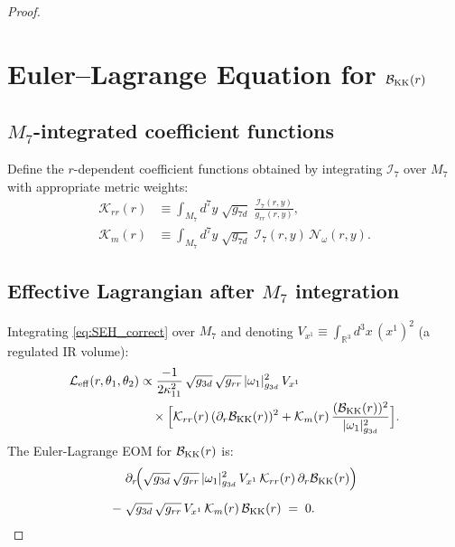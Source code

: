 \documentclass[a4paper,11pt,fleqn]{article}
\theoremstyle{plain}
\theoremstyle{definition}
\newcommand{\Nf}{{\cal B}_{\rm KK}(r)}
\newcommand{\gthree}{g_{3d}}
\newcommand{\gseven}{g_{7d}}
\newcommand{\grr}{g_{rr}}
\newcommand{\kap}{\kappa_{11}}
\newcommand{\Leff}{\mathcal{L}_{\mathrm{eff}}}
\newcommand{\Ical}{\mathcal{I}_7}
\begin{document}
\begin{proof}
\section*{Euler--Lagrange Equation for ${\cal B}_{\rm KK}(r)$}

\subsection*{$M_7$-integrated coefficient functions}

Define the $r$-dependent coefficient functions obtained by integrating $\Ical$
over $M_7$ with appropriate metric weights:
\begin{align}
  \mathcal{K}_{rr}(r)
  &\equiv
    \int_{M_7}d^7y\;\sqrt{\gseven}\;
    \frac{\Ical(r,y)}{\grr(r,y)},
  \label{eq:Krr}\\[4pt]
  \mathcal{K}_m(r)
  &\equiv
    \int_{M_7}d^7y\;\sqrt{\gseven}\;\Ical(r,y)\,\mathcal{N}_\omega(r,y).
  \label{eq:Km}
\end{align}

\subsection*{Effective Lagrangian after $M_7$ integration}

Integrating \eqref{eq:SEH_correct} over $M_7$ and denoting
$V_{x^1}\equiv\int_{\mathbb{R}^3}d^3x\,(x^1)^2$ (a regulated IR volume):
\begin{align}
  \Leff(r,\theta_1,\theta_2)
  &\propto \frac{-1}{2\kap^2}\,
     \sqrt{\gthree}\,\sqrt{\grr}\,
     |\omega_1|^2_{g_{3d}}\,V_{x^1}
  \nonumber\\
  &\quad\times
  \Bigl[
    \mathcal{K}_{rr}(r)\,(\partial_r\Nf)^2
        + \mathcal{K}_m(r)\,\frac{(\Nf)^2}{|\omega_1|^2_{g_{3d}}}
  \Bigr].
  \label{eq:Leff-proof}
\end{align}
The Euler-Lagrange EOM for ${\cal B}_{\rm KK}(r)$ is:
\begin{align}
  &\partial_r\!\Bigl(
    \sqrt{\gthree}\,\sqrt{\grr}\,
    |\omega_1|^2_{g_{3d}}\,V_{x^1}\,
    \mathcal{K}_{rr}(r)\,\partial_r\Nf
  \Bigr)
  \nonumber\\[5pt]
   -\;&\sqrt{\gthree}\,\sqrt{\grr}\,V_{x^1}\,
    \mathcal{K}_m(r)\,\Nf
  \;=\; 0.
  \label{eq:EOM-proof}
\end{align}


\end{proof}
\end{document}
